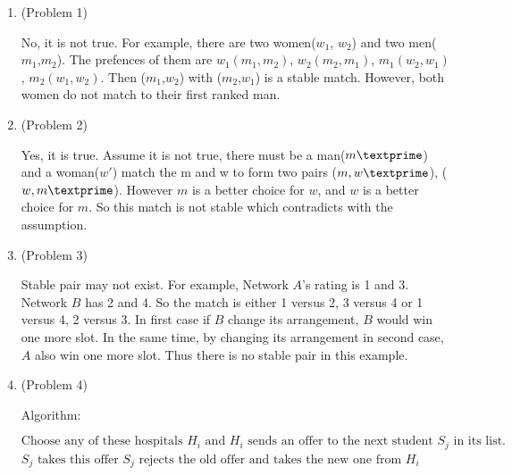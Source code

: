 \normalfont\documentclass[letterpaper,11pt]{article}
\begin{document}
\setlength{\parindent}{2ex}
\newcommand{\header}{
	\noindent {}
}

\bigskip
\header

\begin{enumerate}
\item (Problem 1)\par
	No, it is not true. For example, there are two women($w_1$, $w_2$) and two men($m_1$,$m_2$). The prefences of them are $w_1(m_1,m_2)$, $w_2(m_2,m_1)$, $m_1(w_2,w_1)$, $m_2(w_1,w_2)$. Then ($m_1$,$w_2$) with ($m_2$,$w_1$) is a stable match. However, both women do not match to their first ranked man.\newline

\item (Problem 2)\par
	Yes, it is true. Assume it is not true, there must be a man($m\textprime$) and a woman($w\prime$) match the m and w to form two pairs ($m,w\textprime$), ($w, m\textprime$). However $m$ is a better choice for $w$, and $w$ is a  better choice for $m$. So this match is not stable which contradicts with the assumption. \newline

\item (Problem 3)\par
	Stable pair may not exist. For example, Network $A$'s rating is 1 and 3. Network $B$ has 2 and 4. So the match is either 1 versus 2, 3 versus 4 or 1 versus 4, 2 versus 3. In first case if $B$ change its arrangement, $B$ would win one more slot. In the same time, by changing its arrangement in second case, $A$ also win one more slot. Thus there is no stable pair in this example.
\item (Problem 4)\par
\begin{algorithm}
\caption{Algorithm:}
	\begin{algorithmic}[1]
			\State $\text{Choose any of these hospitals $H_i$ and $H_i$ sends an offer to the next student $S_j$ in its list.}$
				\State $S_j\text{ takes this offer}$
				\State $S_j \text{ rejects the old offer and takes the new one from }H_i$
			\EndIf
		\EndWhile
	\end{algorithmic}
\end{algorithm}


\end{enumerate}
\end{document}
